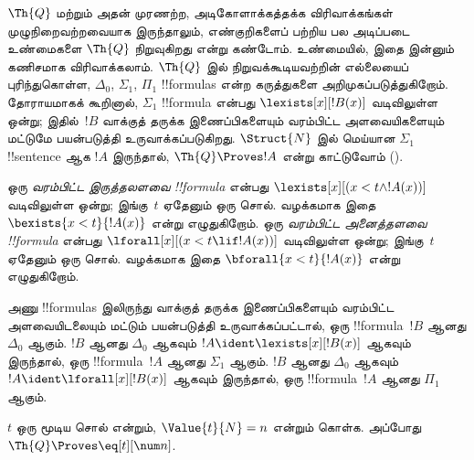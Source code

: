 \documentclass[../../../include/open-logic-section]{subfiles}
\begin{document}


$\Th{Q}$ மற்றும் அதன் முரணற்ற, அடிகோளாக்கத்தக்க விரிவாக்கங்கள்
முழுநிறைவற்றவையாக இருந்தாலும், எண்குறிகளைப் பற்றிய பல அடிப்படை உண்மைகளை
$\Th{Q}$ நிறுவுகிறது என்று கண்டோம். உண்மையில், இதை இன்னும் கணிசமாக
விரிவாக்கலாம். $\Th{Q}$ இல் நிறுவக்கூடியவற்றின் எல்லையைப் புரிந்துகொள்ள,
$\Delta_0$, $\Sigma_1$, $\Pi_1$ !!{formula}s என்ற கருத்துகளை
அறிமுகப்படுத்துகிறோம். தோராயமாகக் கூறினால், $\Sigma_1$ !!{formula} என்பது
$\lexists[x][!B(x)]$ வடிவிலுள்ள ஒன்று; இதில்~$!B$ வாக்குத் தருக்க
இணைப்பிகளையும் வரம்பிட்ட அளவையிகளையும் மட்டுமே பயன்படுத்தி
உருவாக்கப்படுகிறது. $\Struct{N}$ இல் மெய்யான $\Sigma_1$ !!{sentence} ஆக
$!A$ இருந்தால், $\Th{Q} \Proves !A$ என்று காட்டுவோம்
().

\begin{defn}
ஒரு \emph{வரம்பிட்ட இருத்தலளவை !!{formula}} என்பது
$\lexists[x][(x < t \land !A(x))]$ வடிவிலுள்ள ஒன்று; இங்கு~$t$ ஏதேனும்
ஒரு சொல். வழக்கமாக இதை $\bexists{x < t}{!A(x)}$ என்று எழுதுகிறோம்.
%
ஒரு \emph{வரம்பிட்ட அனைத்தளவை !!{formula}} என்பது
$\lforall[x][(x < t \lif !A(x))]$ வடிவிலுள்ள ஒன்று; இங்கு~$t$ ஏதேனும்
ஒரு சொல். வழக்கமாக இதை $\bforall{x < t}{!A(x)}$ என்று எழுதுகிறோம்.
\end{defn}

\begin{defn}
அணு !!{formula}s இலிருந்து வாக்குத் தருக்க இணைப்பிகளையும் வரம்பிட்ட
அளவையிடலையும் மட்டும் பயன்படுத்தி உருவாக்கப்பட்டால்,
ஒரு !!{formula}~$!B$ ஆனது $\Delta_0$ ஆகும்.
%
$!B$ ஆனது $\Delta_0$ ஆகவும் $!A \ident \lexists[x][!B(x)]$ ஆகவும்
இருந்தால், ஒரு !!{formula}~$!A$ ஆனது $\Sigma_1$ ஆகும்.
%
$!B$ ஆனது $\Delta_0$ ஆகவும் $!A \ident \lforall[x][!B(x)]$ ஆகவும்
இருந்தால், ஒரு !!{formula}~$!A$ ஆனது $\Pi_1$ ஆகும்.
\end{defn}

\begin{lem}
 $t$ ஒரு மூடிய சொல் என்றும்,
$\Value{t}{N} = n$ என்றும் கொள்க. அப்போது
$\Th{Q} \Proves \eq[t][\num n]$.
\end{lem}
\end{document}

